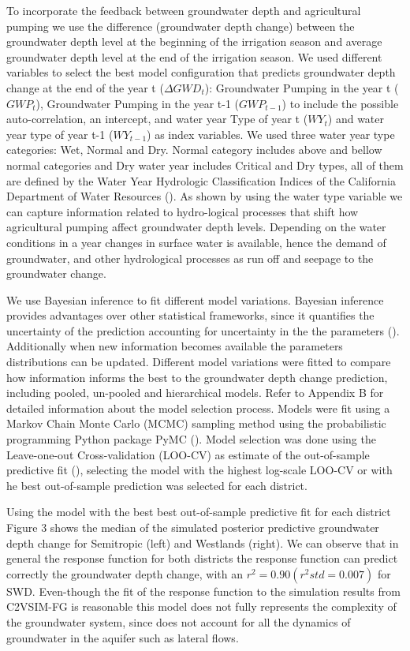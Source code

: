 \documentclass[11pt,a4paper]{article}
\begin{document}
To incorporate the feedback between groundwater depth and agricultural pumping we use the difference (groundwater depth change) between the groundwater depth level at the beginning of the irrigation season and average groundwater depth level at the end of the irrigation season. We used different variables to select the best model configuration that predicts groundwater depth change at the end of the year t ($\Delta GWD_{t}$): Groundwater Pumping in the year t ($GWP_{t}$), Groundwater Pumping in the year t-1 ($GWP_{t-1}$) to include the possible auto-correlation, an intercept, and water year Type of year t ($WY_{t}$) and water year type of year t-1 ($WY_{t-1}$) as index variables. We used three water year type categories: Wet, Normal and Dry. Normal category includes above and bellow normal categories and Dry water year includes Critical and Dry types, all of them are defined by the Water Year Hydrologic Classification Indices of the California Department of Water Resources (\cite{dwr_california_2020}). As shown by \textcite{macewan_hydroeconomic_2017} using the water type variable we can capture information related to hydro-logical processes that shift how agricultural pumping affect groundwater depth levels. Depending on the water conditions in a year changes in surface water is available, hence the demand of groundwater, and other hydrological processes as run off and seepage to the groundwater change. 

We use Bayesian inference to fit different model variations. Bayesian inference provides advantages over other statistical frameworks, since it quantifies the uncertainty of the prediction accounting for uncertainty in the the parameters (\cite{mcelreath_statistical_2020}). Additionally when new information becomes available the parameters distributions can be updated. Different model variations were fitted to compare how information informs the best to the groundwater depth change prediction, including pooled, un-pooled and hierarchical models. Refer to Appendix B for detailed information about the model selection process. Models were fit using a Markov Chain Monte Carlo (MCMC) sampling method using the probabilistic programming Python package PyMC (\cite{salvatier_probabilistic_2016}). Model selection was done using the Leave-one-out Cross-validation (LOO-CV) as estimate of the out-of-sample predictive fit (\cite{vehtari_practical_2017}), selecting the model with the highest log-scale LOO-CV or with he best out-of-sample prediction was selected for each district.

Using the model with the best best out-of-sample predictive fit for each district Figure 3 shows the median of the simulated posterior predictive groundwater depth change for Semitropic (left) and Westlands (right). We can observe that in general the response function for both districts the response function can predict correctly the groundwater depth change, with an $r^2 = 0.90 (r^2 std = 0.007)$ for SWD. Even-though the fit of the response function to the simulation results from C2VSIM-FG is reasonable this model does not fully represents the complexity of the groundwater system, since does not account for all the dynamics of groundwater in the aquifer such as lateral flows.
\end{document}
